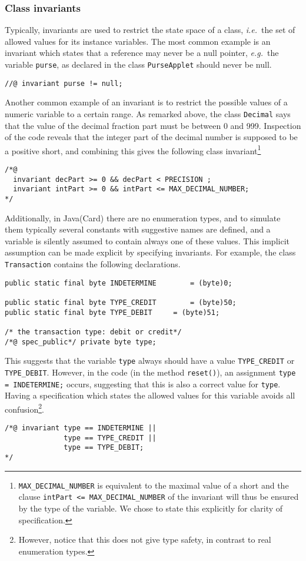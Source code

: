 \documentclass[a4paper]{llncs}
\begin{document}
\subsubsection{Class invariants}
Typically, invariants are used to restrict the state space of a class,
\emph{i.e.}~the set of allowed values for its instance variables. The
most common example is an invariant which states that a reference may
never be a null pointer, \emph{e.g.}~the variable
\texttt{purse}, as declared in the class \texttt{PurseApplet}
should never be null.
\begin{verbatim}
//@ invariant purse != null;
\end{verbatim}
Another common example of an invariant is to restrict the possible
values of a numeric variable to a certain range. As remarked above,
the class \texttt{Decimal} says that the value of the decimal fraction
part must be between 0 and 999. Inspection of the code reveals that
the integer part of the decimal number is supposed to be a positive
short, and combining this gives the following class
invariant\footnote{\texttt{MAX\_DECIMAL\_NUMBER} is equivalent to the
maximal value of a short and the clause \texttt{intPart <=
MAX\_DECIMAL\_NUMBER} of the invariant will thus be ensured by the
type of the variable. We chose to state this explicitly for clarity of
specification.}
\begin{verbatim}
/*@
  invariant decPart >= 0 && decPart < PRECISION ;
  invariant intPart >= 0 && intPart <= MAX_DECIMAL_NUMBER;
*/
\end{verbatim}

Additionally, in Java(Card) there are no enumeration types, and to
simulate them typically several constants with suggestive names are
defined, and a variable is silently assumed to contain always one of
these values. This implicit assumption can be made explicit by
specifying invariants. For example, the class \texttt{Transaction}
contains the following declarations.
\begin{verbatim}
public static final byte INDETERMINE		= (byte)0;

public static final byte TYPE_CREDIT		= (byte)50;
public static final byte TYPE_DEBIT		= (byte)51;
    
/* the transaction type: debit or credit*/
/*@ spec_public*/ private byte type;
\end{verbatim}

This suggests that the variable \texttt{type} always should have a
value \texttt{TYPE\_CREDIT} or \texttt{TYPE\_DEBIT}. However, in the
code (in the method \texttt{reset()}), an assignment \texttt{type =
INDETERMINE;} occurs, suggesting that this is also a correct value for 
\texttt{type}. Having a specification which states the allowed values
for this variable avoids all confusion\footnote{However, notice that
this does not give type safety, in contrast to real enumeration types.}.
\begin{verbatim}
/*@ invariant type == INDETERMINE ||
              type == TYPE_CREDIT || 
              type == TYPE_DEBIT;
*/
\end{verbatim}
\end{document}
